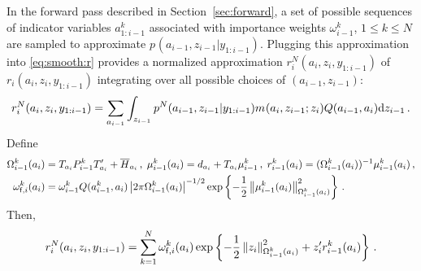 In the forward pass described in Section~\ref{sec:forward}, a set of possible sequences of indicator variables $a_{1:i-1}^k$ associated with importance weights $\omega_{i-1}^k$, $1\le k\le N$ are sampled to approximate $p_{}(a_{i-1},z_{i-1}|y_{1:i-1})$. 
Plugging this approximation into \eqref{eq:smooth:r} provides a normalized approximation $r^N_{i}(a_{i},z_{i},y_{1:i-1})$ of $r_{i}(a_{i},z_{i},y_{1:i-1})$ integrating over all possible choices of $(a_{i-1},z_{i-1})$:
\[
r^N_{i}(a_{i},z_{i},y_{1:i-1}) = \sum_{a_{i-1}}\int_{z_{i-1}}p^N_{}(a_{i-1},z_{i-1}|y_{1:i-1})m_{}(a_{i},z_{i-1};z_{i})Q(a_{i-1},a_{i}) \mathrm{d} z_{i-1}\,.
\]
Define
\begin{align*}
\Omega^k_{i-1}(a_{i}) &= T_{a_{i}}P^k_{i-1}T'_{a_{i}} + \overline{H}_{a_{i}}\,,\;\mu^k_{i-1}(a_{i}) = d_{a_{i}} + T_{a_{i}}\mu^k_{i-1}\,,\;r_{i-1}^k(a_{i}) = (\Omega^k_{i-1}(a_{i}))^{-1}\mu^k_{i-1}(a_{i})\,,\\
\omega_{\mathsf{f},i}^k(a_{i}) &= \omega^k_{i-1}Q(a^k_{i-1},a_{i}) \left|2\pi \Omega^k_{i-1}(a_{i})\right|^{-1/2}\exp\left\{-\frac{1}{2}\left\|\mu^k_{i-1}(a_{i})\right\|_{\Omega^k_{i-1}(a_{i})}^2\right\}\,.
\end{align*}
Then,
\begin{equation}
\label{eq:rN}
r^N_{i}(a_{i},z_{i},y_{1:i-1}) = \sum_{k=1}^N \omega_{\mathsf{f},i}^k(a_{i})\exp\left\{-\frac{1}{2}\normMat{\Omega^k_{i-1}(a_{i})}{z_{i}}^2+z'_{i}r_{i-1}^k(a_{i})\right\}\eqsp.
\end{equation}

